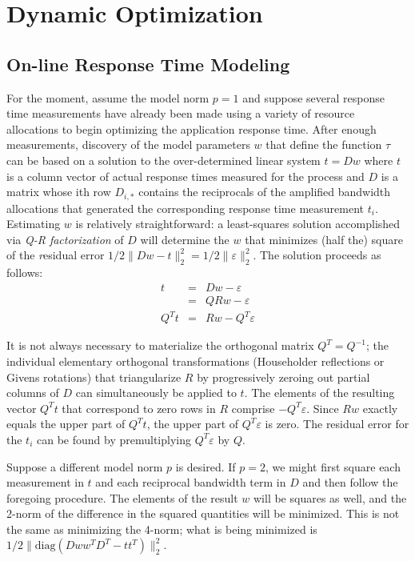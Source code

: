 \section{Dynamic Optimization}


\subsection*{On-line Response Time Modeling}

For the moment, assume the model norm $p = 1$ and suppose several response time measurements have already been made using a variety of resource allocations to begin optimizing the application response time.  After enough measurements, discovery of the model parameters $w$ that define the function $\tau$ can be based on a solution to the over-determined linear system
$t=Dw$
where $t$ is a column vector of actual response times measured for the process
and $D$ is a matrix whose ith row $D_{i,*}$ contains the reciprocals of the amplified bandwidth allocations
that generated the corresponding response time measurement $t_i$.
Estimating $w$ is relatively straightforward: a least-squares solution accomplished via
\emph{Q-R factorization}\cite{GoVL} of $D$ will determine the $w$ that minimizes (half the)
square of the \emph residual error $1/2 \|Dw - t\|^2_2 = 1/2 \|\varepsilon\|^2_2$.
The solution proceeds as follows:
\begin{eqnarray*}
t     &=& Dw  - \varepsilon    \\
      &=& QRw - \varepsilon    \\
Q^Tt  &=& Rw  - Q^T\varepsilon
\end{eqnarray*}

It is not always necessary to materialize the orthogonal matrix $Q^T = Q^{-1}$;
the individual elementary orthogonal transformations (Householder reflections or Givens rotations)
that triangularize $R$ by progressively zeroing out partial columns of $D$ can simultaneously be applied to $t$.
The elements of the resulting vector $Q^Tt$ that correspond to zero rows in $R$ comprise $-Q^T\varepsilon$.
Since $Rw$ exactly equals the upper part of $Q^Tt$, the upper part of $Q^T\varepsilon$ is zero. The residual error for the $t_i$
can be found by premultiplying $Q^T\varepsilon$ by $Q$.

Suppose a different model norm $p$ is desired.  If $p = 2$, we might first square each measurement in $t$
and each reciprocal bandwidth term in $D$ and then follow the foregoing procedure.
The elements of the result $w$ will be squares as well, and the 2-norm of the difference in the squared quantities will be minimized.  This is not the same as minimizing the 4-norm; what is being minimized is $1/2\|\mbox{diag}(Dww^TD^T - tt^T)\|^2_2$.

